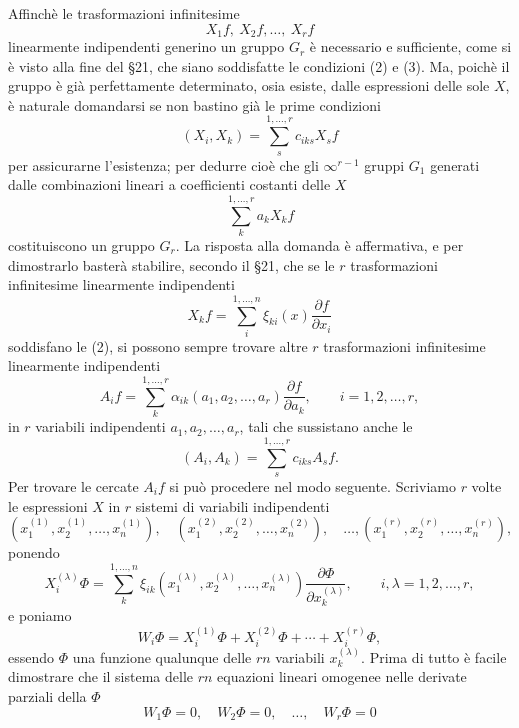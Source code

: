 \documentclass[11pt]{book}
\begin{document}
Affinchè le trasformazioni infinitesime
\[
 X_1f,\ X_2f,\ldots,\ X_rf
\]
linearmente indipendenti generino un gruppo $G_r$ è necessario e sufficiente, come si è visto alla fine del \S{}21, che siano soddisfatte le condizioni (2) e (3). Ma, poichè il gruppo è già perfettamente determinato, osia esiste, dalle espressioni delle sole $X$, è naturale domandarsi se non bastino già le prime condizioni
\begin{equation*}\tag{2}
 (X_i,X_k)=\sum\limits_s^{1,\ldots,r} c_{iks}X_s f
\end{equation*}
per assicurarne l'esistenza; per dedurre cioè che gli $\infty^{r-1}$ gruppi $G_1$ generati dalle combinazioni lineari a coefficienti costanti delle $X$
\[
 \sum\limits_k^{1,\ldots,r} a_kX_kf
\]
costituiscono un gruppo $G_r$. La risposta alla domanda è affermativa, e per dimostrarlo basterà stabilire, secondo il \S{}21, che se le $r$ trasformazioni infinitesime linearmente indipendenti
\begin{equation*}\tag{2*}
 X_kf=\sum\limits_i^{1,\ldots,n}\xi_{ki}(x)\frac{\partial f}{\partial x_i}
\end{equation*}
soddisfano le (2), si possono sempre trovare altre $r$ trasformazioni infinitesime linearmente indipendenti
\[
 A_if=\sum\limits_k^{1,\ldots,r}\alpha_{ik}(a_1,a_2,\ldots,a_r)
        \frac{\partial f}{\partial a_k},
 \qquad i=1,2,\ldots,r,
\]
in $r$ variabili indipendenti $a_1,a_2,\ldots,a_r$, tali che sussistano anche le
\begin{equation*}\tag{3}
 (A_i,A_k)=\sum\limits_s^{1,\ldots,r}c_{iks}A_s f.
\end{equation*}
Per trovare le cercate $A_if$ si può procedere nel modo seguente. Scriviamo $r$ volte le espressioni $X$ in $r$ sistemi di variabili indipendenti
\[
 (x^{(1)}_1,x^{(1)}_2,\ldots,x^{(1)}_n),\quad
 (x^{(2)}_1,x^{(2)}_2,\ldots,x^{(2)}_n),\quad \ldots,
 (x^{(r)}_1,x^{(r)}_2,\ldots,x^{(r)}_n),
\]
ponendo
\[
 X^{(\lambda)}_i\Phi=
 \sum\limits_k^{1,\ldots,n}\xi_{ik}(x^{(\lambda)}_1,x^{(\lambda)}_2,\ldots,x^{(\lambda)}_n)
       \frac{\partial\Phi}{\partial x^{(\lambda)}_k},
 \qquad i,\lambda=1,2,\ldots,r,
\]
e poniamo
\begin{equation*}\tag{8}
 W_i\Phi=X_i^{(1)}\Phi+X_i^{(2)}\Phi+\cdots+X_i^{(r)}\Phi,
\end{equation*}
essendo $\Phi$ una funzione qualunque delle $rn$ variabili $x^{(\lambda)}_k$. Prima di tutto è facile dimostrare che il sistema delle $rn$ equazioni lineari omogenee nelle derivate parziali della $\Phi$
\begin{equation*}\tag{9}
 W_1\Phi=0,
 \quad W_2\Phi=0,
 \quad \ldots,
 \quad W_r\Phi=0
\end{equation*}
\end{document}
